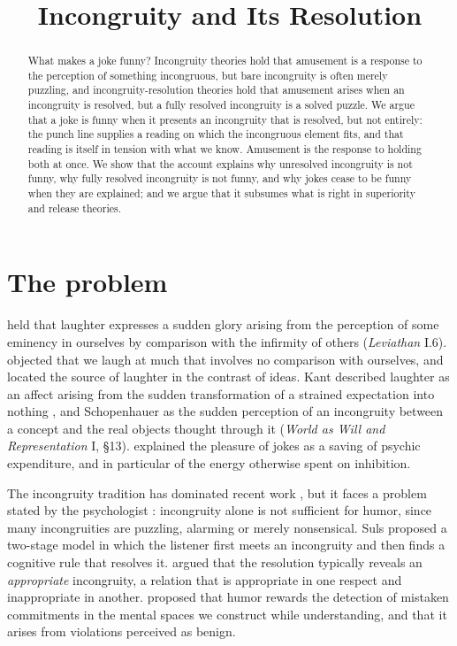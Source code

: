 \documentclass{situationist-preprint}
\title{Incongruity and Its Resolution}
\begin{document}
\maketitle

\begin{abstract}
What makes a joke funny? Incongruity theories hold that amusement is a response to the perception of something incongruous, but bare incongruity is often merely puzzling, and incongruity-resolution theories hold that amusement arises when an incongruity is resolved, but a fully resolved incongruity is a solved puzzle. We argue that a joke is funny when it presents an incongruity that is resolved, but not entirely: the punch line supplies a reading on which the incongruous element fits, and that reading is itself in tension with what we know. Amusement is the response to holding both at once. We show that the account explains why unresolved incongruity is not funny, why fully resolved incongruity is not funny, and why jokes cease to be funny when they are explained; and we argue that it subsumes what is right in superiority and release theories.
\end{abstract}

\section{The problem}

\citet{Hobbes1651} held that laughter expresses a sudden glory arising from the perception of some eminency in ourselves by comparison with the infirmity of others (\emph{Leviathan} I.6). \citet{Hutcheson1750} objected that we laugh at much that involves no comparison with ourselves, and located the source of laughter in the contrast of ideas. Kant described laughter as an affect arising from the sudden transformation of a strained expectation into nothing \citep[§54]{Kant1790}, and Schopenhauer as the sudden perception of an incongruity between a concept and the real objects thought through it (\emph{World as Will and Representation} I, §13). \citet{Freud1905} explained the pleasure of jokes as a saving of psychic expenditure, and in particular of the energy otherwise spent on inhibition.

The incongruity tradition has dominated recent work \citep{Morreall1983,Carroll2014}, but it faces a problem stated by the psychologist \citet{Suls1972}: incongruity alone is not sufficient for humor, since many incongruities are puzzling, alarming or merely nonsensical. Suls proposed a two-stage model in which the listener first meets an incongruity and then finds a cognitive rule that resolves it. \citet{Oring1992} argued that the resolution typically reveals an \emph{appropriate} incongruity, a relation that is appropriate in one respect and inappropriate in another. \citet{HurleyDennettAdams2011} proposed that humor rewards the detection of mistaken commitments in the mental spaces we construct while understanding, and \citet{McGrawWarren2010} that it arises from violations perceived as benign.
\end{document}
